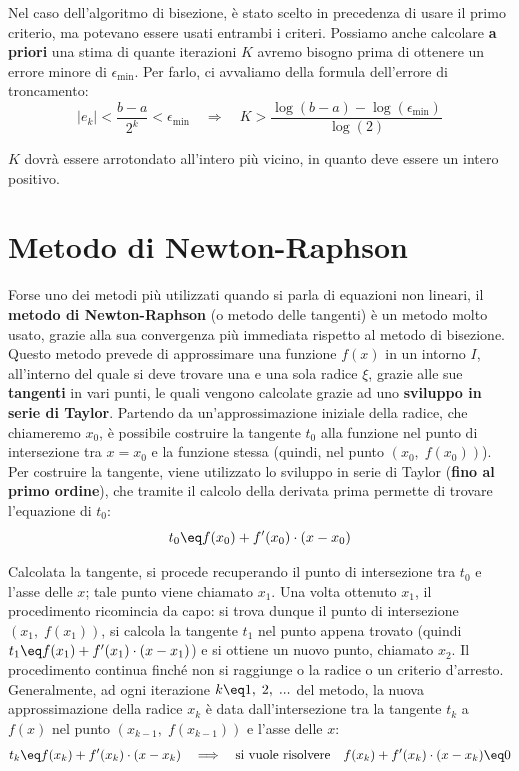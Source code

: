 Nel caso dell'algoritmo di bisezione, è stato scelto in precedenza di usare il primo criterio, ma potevano essere usati entrambi i criteri. Possiamo anche calcolare \textbf{a priori} una stima di quante iterazioni $K$ avremo bisogno prima di ottenere un errore minore di $\epsilon_{\text{min}}$. Per farlo, ci avvaliamo della formula dell'errore di troncamento:
\[ |e_k| < \frac{b - a}{2^k} < \epsilon_{\text{min}} \quad \Longrightarrow \quad K > \frac{\log(b - a) - \log(\epsilon_{\text{min}})}{\log(2)} \]

$K$ dovrà essere arrotondato all'intero più vicino, in quanto deve essere un intero positivo.

\section{Metodo di Newton-Raphson}

Forse uno dei metodi più utilizzati quando si parla di equazioni non lineari, il \textbf{metodo di Newton-Raphson} (o metodo delle tangenti) è un metodo molto usato, grazie alla sua convergenza più immediata rispetto al metodo di bisezione. Questo metodo prevede di approssimare una funzione $f(x)$ in un intorno $I$, all'interno del quale si deve trovare una e una sola radice $\xi$, grazie alle sue \textbf{tangenti} in vari punti, le quali vengono calcolate grazie ad uno \textbf{sviluppo in serie di Taylor}.
\nwl
Partendo da un'approssimazione iniziale della radice, che chiameremo $x_0$, è possibile costruire la tangente $t_0$ alla funzione nel punto di intersezione tra $x = x_0$ e la funzione stessa (quindi, nel punto $(x_0, \; f(x_0))$). Per costruire la tangente, viene utilizzato lo sviluppo in serie di Taylor (\textbf{fino al primo ordine}), che tramite il calcolo della derivata prima permette di trovare l'equazione di $t_0$:
\[ t_0 \eq f(x_0) + f'(x_0) \cdot (x - x_0) \]

Calcolata la tangente, si procede recuperando il punto di intersezione tra $t_0$ e l'asse delle $x$; tale punto viene chiamato $x_1$. Una volta ottenuto $x_1$, il procedimento ricomincia da capo: si trova dunque il punto di intersezione $(x_1, \; f(x_1))$, si calcola la tangente $t_1$ nel punto appena trovato (quindi $t_1 \eq f(x_1) + f'(x_1) \cdot (x - x_1)$) e si ottiene un nuovo punto, chiamato $x_2$. Il procedimento continua finché non si raggiunge o la radice o un criterio d'arresto.
\nwl
Generalmente, ad ogni iterazione $k \eq 1, \; 2, \; ...$ del metodo, la nuova approssimazione della radice $x_k$ è data dall'intersezione tra la tangente $t_k$ a $f(x)$ nel punto $(x_{k - 1}, \; f(x_{k - 1}))$ e l'asse delle $x$:
\[ t_{k} \eq f(x_k) + f'(x_k) \cdot (x - x_k) \quad \Longrightarrow \quad \text{si vuole risolvere} \quad f(x_k) + f'(x_k) \cdot (x - x_k) \eq 0 \]

